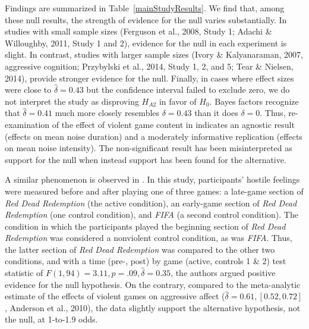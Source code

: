 \documentclass[man]{apa6}
\begin{document}
Findings are summarized in Table~\ref{mainStudyResults}. We find that, among these null results, the strength of evidence for the null varies substantially. In studies with small sample sizes (Ferguson et al., 2008, Study 1; Adachi \& Willoughby, 2011, Study 1 and 2), evidence for the null in each experiment is slight. 
In contrast, studies with larger sample sizes (Ivory \& Kalyanaraman, 2007, aggressive cognition; Przybylski et al., 2014, Study 1, 2, and 5; Tear \& Nielsen, 2014), \nocite{Ivory:Kalyanaraman:2007,Przybylski:etal:2014,Tear:Nielsen:2014} provide stronger evidence for the null.	Finally, in cases where effect sizes were close to $\hat{\delta} = 0.43$ but the confidence interval failed to exclude zero, we do not interpret the study as disproving $H_{A2}$ in favor of $H_0$. Bayes factors recognize that $\hat{\delta} = 0.41$ much more closely resembles $\delta = 0.43$ than it does $\delta = 0$. 
Thus, re-examination of the effect of violent game content in \citet{Elson:etal:2013} indicates an agnostic result (effects on mean noise duration) and a moderately informative replication (effects on mean noise intensity). The non-significant result has been misinterpreted as support for the null when instead support has been found for the alternative.  

A similar phenomenon is observed in \citet{Valadez:Ferguson:2012}. In this study, participants' hostile feelings were measured before and after playing one of three games: a late-game section of {\em Red Dead Redemption} (the active condition), an early-game section of {\em Red Dead Redemption} (one control condition), and {\em FIFA} (a second control condition). The condition in which the participants played the beginning section of {\em Red Dead Redemption} was considered a nonviolent control condition, as was {\em FIFA}. Thus, the latter section of {\em Red Dead Redemption} was compared to the other two conditions, and with a time (pre-, post) by game (active, controls 1 \& 2) test statistic of $F(1, 94) = 3.11, p = .09, \hat{\delta} = 0.35$, the authors argued positive evidence for the null hypothesis. On the contrary, compared to the meta-analytic estimate of the effects of violent games on aggressive affect ($\hat{\delta} = 0.61, [0.52, 0.72]$, Anderson et al., 2010), the data slightly support the alternative hypothesis, not the null, at 1-to-1.9 odds. 
\end{document}
